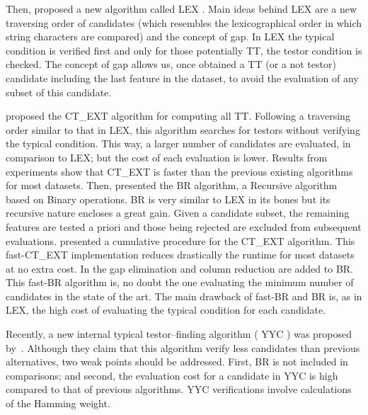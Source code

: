 \documentclass[authoryear,11pt]{elsarticle}
\makeatletter
\newcommand{\setword}[2]{%
  \phantomsection
  #1\def\@currentlabel{\unexpanded{#1}}\label{#2}%
}
\makeatother
\begin{document}
  Then, \cite{Santiesteban03} proposed a new algorithm
  called \setword{LEX}{LEX}. Main ideas behind LEX are a new traversing order of candidates (which resembles the
  lexicographical order in which string characters are compared) and the concept of gap. In LEX
  the typical condition is verified first and only for those potentially TT, the testor 
  condition is checked. %
  The concept of gap allows us, once obtained a TT (or a not testor) candidate including 
  the last feature in the dataset, to avoid the evaluation of any subset of this candidate.
	
  \cite{Sanchez07} proposed the \setword{CT\_EXT}{CTEXT} algorithm for computing all
  TT. Following a traversing order similar to that in LEX, this algorithm searches for
  testors without verifying the typical condition. This way, a larger number of candidates are 
  evaluated, in comparison to LEX; but the cost of each evaluation is lower. Results from experiments
  show that CT\_EXT is faster than the previous existing algorithms for most datasets. Then, \cite{Lias09}
  presented the \setword{BR}{BR} algorithm, a Recursive algorithm based on 
  Binary operations. BR is very similar to LEX in its bones but its recursive nature encloses a great
  gain. Given a candidate subset, the remaining features are tested a priori and those being rejected are
  excluded from subsequent evaluations. \cite{Sanchez10} presented a cumulative
  procedure for the CT\_EXT algorithm. This fast-CT\_EXT implementation reduces drastically the runtime
  for most datasets at no extra cost. In \citep{Lias13} the
  gap elimination and column reduction are added to BR. This fast-BR algorithm is, no doubt the one 
  evaluating the minimum number of candidates in the state of the art. The main drawback of fast-BR and 
  BR is, as in LEX, the high cost of evaluating the typical condition for each candidate. 
 
  Recently, a new internal typical testor--finding algorithm (\setword{YYC}{YYC}) was proposed by~\cite{Alba14}. Although 
  they claim that this algorithm verify less candidates than previous alternatives, two weak points should
  be addressed. First, BR is not included in comparisons; and second, the evaluation cost for a candidate
  in YYC is high compared to that of previous algorithms. YYC verifications involve calculations of the 
  Hamming weight.
\end{document}
